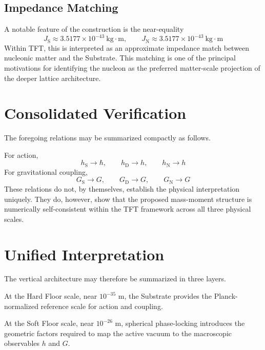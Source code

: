 \subsection{Impedance Matching}
A notable feature of the construction is the near-equality
\begin{equation}
    J_{\mathrm{S}} \approx 3.5177 \times 10^{-43}\ \text{kg}\cdot\text{m}, \qquad J_{\mathrm{N}} \approx 3.5177 \times 10^{-43}\ \text{kg}\cdot\text{m}
\end{equation}
Within TFT, this is interpreted as an approximate impedance match between nucleonic matter and the Substrate. This matching is one of the principal motivations for identifying the nucleon as the preferred matter-scale projection of the deeper lattice architecture.

\section{Consolidated Verification}
The foregoing relations may be summarized compactly as follows.

For action,
\begin{equation}
    h_{\mathrm{S}} \rightarrow \hbar, \qquad h_{\mathrm{D}} \rightarrow h, \qquad h_{\mathrm{N}} \rightarrow h
\end{equation}
For gravitational coupling,
\begin{equation}
    G_{\mathrm{S}} \rightarrow G, \qquad G_{\mathrm{D}} \rightarrow G, \qquad G_{\mathrm{N}} \rightarrow G
\end{equation}
These relations do not, by themselves, establish the physical interpretation uniquely. They do, however, show that the proposed mass-moment structure is numerically self-consistent within the TFT framework across all three physical scales.

\section{Unified Interpretation}

The vertical architecture may therefore be summarized in three layers.

At the Hard Floor scale, near $10^{-35}$ m, the Substrate provides the Planck-normalized reference scale for action and coupling.

At the Soft Floor scale, near $10^{-26}$ m, spherical phase-locking introduces the geometric factors required to map the active vacuum to the macroscopic observables $h$ and $G$.


